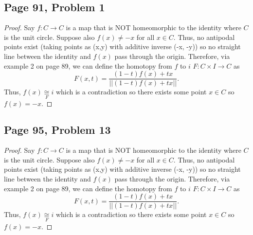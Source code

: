\subsection*{Page 91, Problem 1}
\vspace{15pt}
\begin{proof}
    \vspace{-10pt}
    Say $f\colon C \to C$ is a map that is NOT homeomorphic to the identity where $C$ is the unit circle. Suppose also $f(x) \neq -x$ for all $x \in C$. Thus, no antipodal points exist (taking points as (x,y) with additive inverse (-x, -y)) so no straight line between the identity and $f(x)$ pass through the origin. Therefore, via example 2 on page 89, we can define the homotopy from $f$ to $i$ $F\colon C\times I \to C$ as $$F(x,t) = \frac{(1-t)f(x)+tx}{||(1-t)f(x)+tx||}.$$ Thus, $f(x) \underset{F}{\cong} i$ which is a contradiction so there exists some point $x \in C$ so $f(x) = -x.$
\end{proof}

\subsection*{Page 95, Problem 13}
\vspace{15pt}
\begin{proof}
    \vspace{-10pt}
    Say $f\colon C \to C$ is a map that is NOT homeomorphic to the identity where $C$ is the unit circle. Suppose also $f(x) \neq -x$ for all $x \in C$. Thus, no antipodal points exist (taking points as (x,y) with additive inverse (-x, -y)) so no straight line between the identity and $f(x)$ pass through the origin. Therefore, via example 2 on page 89, we can define the homotopy from $f$ to $i$ $F\colon C\times I \to C$ as $$F(x,t) = \frac{(1-t)f(x)+tx}{||(1-t)f(x)+tx||}.$$ Thus, $f(x) \underset{F}{\cong} i$ which is a contradiction so there exists some point $x \in C$ so $f(x) = -x.$
\end{proof}
